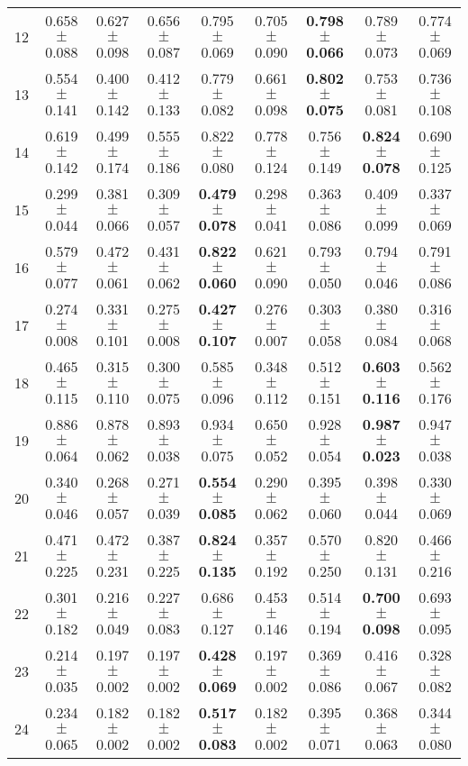 \begin{table}[!ht]
{\begin{tabular}{r c c c c c c c c}
12 & 0.658 $\pm$ 0.088 & 0.627 $\pm$ 0.098 & 0.656 $\pm$ 0.087 & 0.795 $\pm$ 0.069 & 0.705 $\pm$ 0.090 & \textbf{0.798 $\pm$ 0.066} & 0.789 $\pm$ 0.073 & 0.774 $\pm$ 0.069 \\
13 & 0.554 $\pm$ 0.141 & 0.400 $\pm$ 0.142 & 0.412 $\pm$ 0.133 & 0.779 $\pm$ 0.082 & 0.661 $\pm$ 0.098 & \textbf{0.802 $\pm$ 0.075} & 0.753 $\pm$ 0.081 & 0.736 $\pm$ 0.108 \\
14 & 0.619 $\pm$ 0.142 & 0.499 $\pm$ 0.174 & 0.555 $\pm$ 0.186 & 0.822 $\pm$ 0.080 & 0.778 $\pm$ 0.124 & 0.756 $\pm$ 0.149 & \textbf{0.824 $\pm$ 0.078} & 0.690 $\pm$ 0.125 \\
15 & 0.299 $\pm$ 0.044 & 0.381 $\pm$ 0.066 & 0.309 $\pm$ 0.057 & \textbf{0.479 $\pm$ 0.078} & 0.298 $\pm$ 0.041 & 0.363 $\pm$ 0.086 & 0.409 $\pm$ 0.099 & 0.337 $\pm$ 0.069 \\
16 & 0.579 $\pm$ 0.077 & 0.472 $\pm$ 0.061 & 0.431 $\pm$ 0.062 & \textbf{0.822 $\pm$ 0.060} & 0.621 $\pm$ 0.090 & 0.793 $\pm$ 0.050 & 0.794 $\pm$ 0.046 & 0.791 $\pm$ 0.086 \\
17 & 0.274 $\pm$ 0.008 & 0.331 $\pm$ 0.101 & 0.275 $\pm$ 0.008 & \textbf{0.427 $\pm$ 0.107} & 0.276 $\pm$ 0.007 & 0.303 $\pm$ 0.058 & 0.380 $\pm$ 0.084 & 0.316 $\pm$ 0.068 \\
18 & 0.465 $\pm$ 0.115 & 0.315 $\pm$ 0.110 & 0.300 $\pm$ 0.075 & 0.585 $\pm$ 0.096 & 0.348 $\pm$ 0.112 & 0.512 $\pm$ 0.151 & \textbf{0.603 $\pm$ 0.116} & 0.562 $\pm$ 0.176 \\
19 & 0.886 $\pm$ 0.064 & 0.878 $\pm$ 0.062 & 0.893 $\pm$ 0.038 & 0.934 $\pm$ 0.075 & 0.650 $\pm$ 0.052 & 0.928 $\pm$ 0.054 & \textbf{0.987 $\pm$ 0.023} & 0.947 $\pm$ 0.038 \\
20 & 0.340 $\pm$ 0.046 & 0.268 $\pm$ 0.057 & 0.271 $\pm$ 0.039 & \textbf{0.554 $\pm$ 0.085} & 0.290 $\pm$ 0.062 & 0.395 $\pm$ 0.060 & 0.398 $\pm$ 0.044 & 0.330 $\pm$ 0.069 \\
21 & 0.471 $\pm$ 0.225 & 0.472 $\pm$ 0.231 & 0.387 $\pm$ 0.225 & \textbf{0.824 $\pm$ 0.135} & 0.357 $\pm$ 0.192 & 0.570 $\pm$ 0.250 & 0.820 $\pm$ 0.131 & 0.466 $\pm$ 0.216 \\
22 & 0.301 $\pm$ 0.182 & 0.216 $\pm$ 0.049 & 0.227 $\pm$ 0.083 & 0.686 $\pm$ 0.127 & 0.453 $\pm$ 0.146 & 0.514 $\pm$ 0.194 & \textbf{0.700 $\pm$ 0.098} & 0.693 $\pm$ 0.095 \\
23 & 0.214 $\pm$ 0.035 & 0.197 $\pm$ 0.002 & 0.197 $\pm$ 0.002 & \textbf{0.428 $\pm$ 0.069} & 0.197 $\pm$ 0.002 & 0.369 $\pm$ 0.086 & 0.416 $\pm$ 0.067 & 0.328 $\pm$ 0.082 \\
24 & 0.234 $\pm$ 0.065 & 0.182 $\pm$ 0.002 & 0.182 $\pm$ 0.002 & \textbf{0.517 $\pm$ 0.083} & 0.182 $\pm$ 0.002 & 0.395 $\pm$ 0.071 & 0.368 $\pm$ 0.063 & 0.344 $\pm$ 0.080 \\

\end{tabular}}
\end{table}
